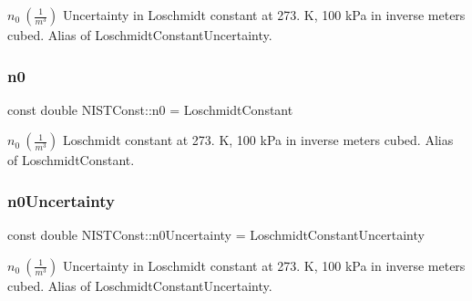 $n_0 \ (\frac{1}{m^3})$ Uncertainty in Loschmidt constant at 273. K, 100 k\+Pa in inverse meters cubed. Alias of Loschmidt\+Constant\+Uncertainty. \mbox{\label{group___n_i_s_t_const-_loschmidt_constant_ga95b0a12ed1a4d5aa9f05a08927be123c}} 
\subsubsection{\texorpdfstring{n0}{n0}}
{\footnotesize\ttfamily const double N\+I\+S\+T\+Const\+::n0 = Loschmidt\+Constant}

$n_0 \ (\frac{1}{m^3})$ Loschmidt constant at 273. K, 100 k\+Pa in inverse meters cubed. Alias of Loschmidt\+Constant. \mbox{\label{group___n_i_s_t_const-_loschmidt_constant_gab05aaddbc9cb5a104a42cc83ab752d78}} 
\subsubsection{\texorpdfstring{n0\+Uncertainty}{n0Uncertainty}}
{\footnotesize\ttfamily const double N\+I\+S\+T\+Const\+::n0\+Uncertainty = Loschmidt\+Constant\+Uncertainty}

$n_0 \ (\frac{1}{m^3})$ Uncertainty in Loschmidt constant at 273. K, 100 k\+Pa in inverse meters cubed. Alias of Loschmidt\+Constant\+Uncertainty. 